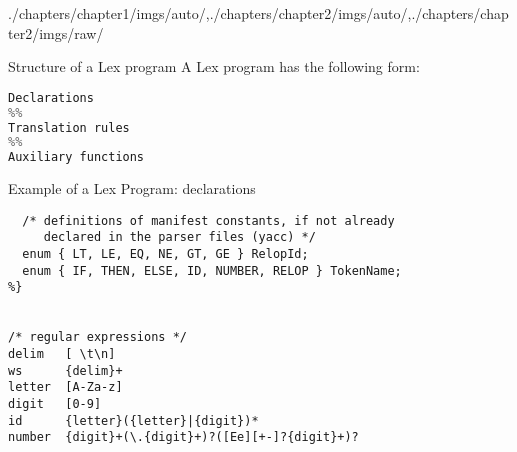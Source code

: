 \begin{graphicspathcontext}{{./chapters/chapter1/imgs/auto/},{./chapters/chapter2/imgs/auto/},{./chapters/chapter2/imgs/raw/}}
\begin{bibunit}[apalike]
\begin{frame}[t,fragile]{Structure of a Lex program}
	A Lex program has the following form:
		\begin{lstlisting}[language=python]
Declarations
%%
Translation rules
%%
Auxiliary functions
		\end{lstlisting}
\end{frame}

\begin{frame}[fragile,background=6]{{Example of a Lex Program:} declarations}
	\begin{lstlisting}[style=lststyle-c]
%{
  /* definitions of manifest constants, if not already
     declared in the parser files (yacc) */
  enum { LT, LE, EQ, NE, GT, GE	} RelopId;
  enum { IF, THEN, ELSE, ID, NUMBER, RELOP } TokenName;
%}


/* regular expressions */
delim   [ \t\n]
ws      {delim}+
letter  [A-Za-z]
digit   [0-9]
id      {letter}({letter}|{digit})*
number  {digit}+(\.{digit}+)?([Ee][+-]?{digit}+)?


\end{lstlisting}
\end{frame}
\end{bibunit}
\end{graphicspathcontext}
